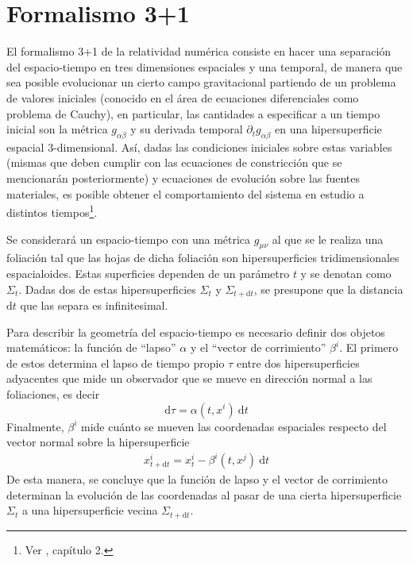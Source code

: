 \documentclass[11pt,twoside,openright,spanish]{report}
\numberwithin{equation}{chapter}
\numberwithin{figure}{chapter}
\numberwithin{table}{chapter}
\begin{document}
\section{Formalismo 3+1}\label{formalismo31}
\noindent
El formalismo 3+1 de la relatividad numérica consiste en hacer una separación del espacio-tiempo en tres dimensiones espaciales y una temporal, de manera que sea posible evolucionar un cierto campo gravitacional partiendo de un problema de valores iniciales (conocido en el área de ecuaciones diferenciales como problema de Cauchy), en particular, las cantidades a especificar a un tiempo inicial son la métrica $g_{\alpha\beta}$ y su derivada temporal $\partial_tg_{\alpha\beta}$ en una hipersuperficie espacial 3-dimensional. Así, dadas las condiciones iniciales sobre estas variables (mismas que deben cumplir con las ecuaciones de constricción que se mencionarán posteriormente) y ecuaciones de evolución sobre las fuentes materiales, es posible obtener el comportamiento del sistema en estudio a distintos tiempos\footnote{Ver \citet{alcubierre}, capítulo 2.}. 

Se considerará un espacio-tiempo con una métrica $g_{\mu\nu}$ al que se le realiza una foliación tal que las hojas de dicha foliación son hipersuperficies tridimensionales espacialoides. Estas superficies dependen de un parámetro $t$ y se denotan como $\Sigma_t$. Dadas dos de estas hipersuperficies $\Sigma_t$ y $\Sigma_{t+\text{d}t}$, se presupone que la distancia $\text{d}t$ que las separa es infinitesimal.

Para describir la geometría del espacio-tiempo es necesario definir dos objetos matemáticos: la función de ``lapso'' $\alpha$ y el ``vector de corrimiento'' $\beta^i$. El primero de estos determina el lapso de tiempo propio $\tau$ entre dos hipersuperficies adyacentes que mide un observador que se mueve en dirección normal a las foliaciones, es decir
\begin{equation}
	\text{d}\tau=\alpha\left(t,x^i\right)\ \text{d}t
\end{equation}
Finalmente, $\beta^i$ mide cuánto se mueven las coordenadas espaciales respecto del vector normal sobre la hipersuperficie
\begin{eqnarray}
	x_{t+\text{d}t}^i=x_t^i-\beta^i\left(t,x^j\right)\ \text{d}t
\end{eqnarray}
De esta manera, se concluye que la función de lapso y el vector de corrimiento determinan la evolución de las coordenadas al pasar de una cierta hipersuperficie $\Sigma_t$ a una hipersuperficie vecina $\Sigma_{t+\text{d}t}$. 
\end{document}
